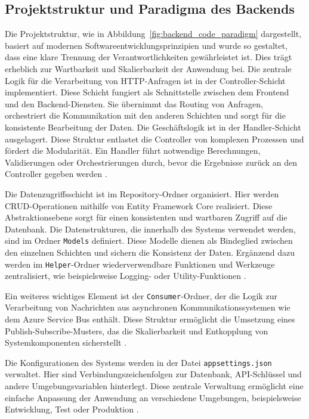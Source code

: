 \subsection{Projektstruktur und Paradigma des Backends}

Die Projektstruktur, wie in Abbildung~\ref{fig:backend_code_paradigm} dargestellt, basiert auf modernen Softwareentwicklungsprinzipien und wurde so gestaltet, dass eine klare Trennung der Verantwortlichkeiten gewährleistet ist. Dies trägt erheblich zur Wartbarkeit und Skalierbarkeit der Anwendung bei. Die zentrale Logik für die Verarbeitung von HTTP-Anfragen ist in der Controller-Schicht implementiert. Diese Schicht fungiert als Schnittstelle zwischen dem Frontend und den Backend-Diensten. Sie übernimmt das Routing von Anfragen, orchestriert die Kommunikation mit den anderen Schichten und sorgt für die konsistente Bearbeitung der Daten. Die Geschäftslogik ist in der Handler-Schicht ausgelagert. Diese Struktur entlastet die Controller von komplexen Prozessen und fördert die Modularität. Ein Handler führt notwendige Berechnungen, Validierungen oder Orchestrierungen durch, bevor die Ergebnisse zurück an den Controller gegeben werden \cite{fowler2002patterns}.

Die Datenzugriffsschicht ist im Repository-Ordner organisiert. Hier werden CRUD-Operationen mithilfe von Entity Framework Core realisiert. Diese Abstraktionsebene sorgt für einen konsistenten und wartbaren Zugriff auf die Datenbank. Die Datenstrukturen, die innerhalb des Systems verwendet werden, sind im Ordner \texttt{Models} definiert. Diese Modelle dienen als Bindeglied zwischen den einzelnen Schichten und sichern die Konsistenz der Daten. Ergänzend dazu werden im \texttt{Helper}-Ordner wiederverwendbare Funktionen und Werkzeuge zentralisiert, wie beispielsweise Logging- oder Utility-Funktionen \cite{efCoreDocs2023}.

Ein weiteres wichtiges Element ist der \texttt{Consumer}-Ordner, der die Logik zur Verarbeitung von Nachrichten aus asynchronen Kommunikationssystemen wie dem Azure Service Bus enthält. Diese Struktur ermöglicht die Umsetzung eines Publish-Subscribe-Musters, das die Skalierbarkeit und Entkopplung von Systemkomponenten sicherstellt \cite{azureServiceBus2024}.

Die Konfigurationen des Systems werden in der Datei \texttt{appsettings.json} verwaltet. Hier sind Verbindungszeichenfolgen zur Datenbank, API-Schlüssel und andere Umgebungsvariablen hinterlegt. Diese zentrale Verwaltung ermöglicht eine einfache Anpassung der Anwendung an verschiedene Umgebungen, beispielsweise Entwicklung, Test oder Produktion \cite{microsoftCloudDesignPatterns}.

